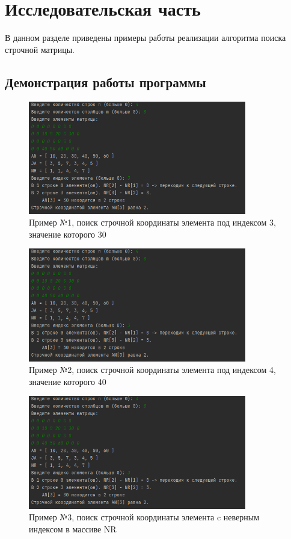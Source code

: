 \chapter{Исследовательская часть}

В данном разделе приведены примеры работы реализации алгоритма поиска строчной матрицы.

\section{Демонстрация работы программы}

\begin{figure}[h]
	\centering
	\includegraphics[width=0.85\textwidth]{img/test-01.png}
	\caption{Пример №1, поиск строчной координаты элемента под индексом 3, значение которого 30}
	\label{fig:test-01}
\end{figure}

\begin{figure}[h]
	\centering
	\includegraphics[width=0.85\textwidth]{img/test-01.png}
	\caption{Пример №2, поиск строчной координаты элемента под индексом 4, значение которого 40}
	\label{fig:test-02}
\end{figure}

\clearpage

\begin{figure}[h]
	\centering
	\includegraphics[width=0.85\textwidth]{img/test-01.png}
	\caption{Пример №3, поиск строчной координаты элемента c неверным индексом в массиве NR}
	\label{fig:test-03}
\end{figure}
